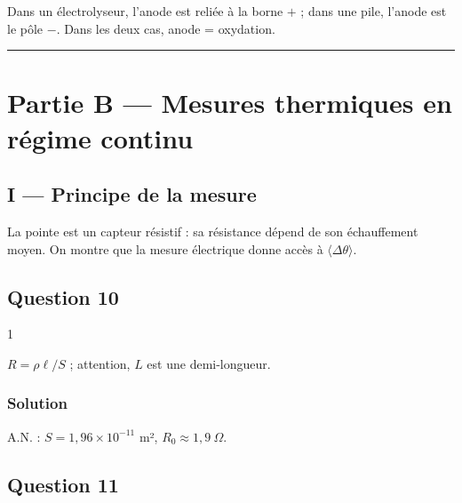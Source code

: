 \documentclass[11pt,a4paper]{article}
\newcommand{\equationajustee}[1]{%
  \sbox{\boiteequation}{$\displaystyle #1$}%
  \ifdim\wd\boiteequation>\linewidth
    \[\resizebox{\linewidth}{!}{\usebox{\boiteequation}}\]%
  \else
    \[#1\]%
  \fi}
\begin{document}
\begin{piege}

Dans un électrolyseur, l'anode est reliée à la borne \(+\) ; dans une pile, l'anode est le pôle \(-\). Dans les deux cas, anode = oxydation.

\end{piege}

\begin{center}\rule{0.5\linewidth}{0.5pt}\end{center}

\hypertarget{partie-b-mesures-thermiques-en-ruxe9gime-continu}{%
\section{Partie B --- Mesures thermiques en régime continu}\label{partie-b-mesures-thermiques-en-ruxe9gime-continu}}

\hypertarget{i-principe-de-la-mesure}{%
\subsection{I --- Principe de la mesure}\label{i-principe-de-la-mesure}}

La pointe est un capteur résistif : sa résistance dépend de son échauffement moyen. On montre que la mesure électrique donne accès à \(\langle\Delta\theta\rangle\).

\hypertarget{question-10}{%
\subsection{Question 10}\label{question-10}}

\begin{indication}{1}

\(R=\rho\ell/S\) ; attention, \(L\) est une demi-longueur.

\end{indication}

\hypertarget{solution-9}{%
\subsubsection{Solution}\label{solution-9}}

\equationajustee{\boxed{R_0=\frac{2\rho_0L}{S}=\frac{2\rho_0L}{\pi R^2}}}

A.N. : \(S=1{,}96\times10^{-11}\) m², \textbf{\(R_0\approx1{,}9\ \Omega\)}.

\hypertarget{question-11}{%
\subsection{Question 11}\label{question-11}}
\end{document}
